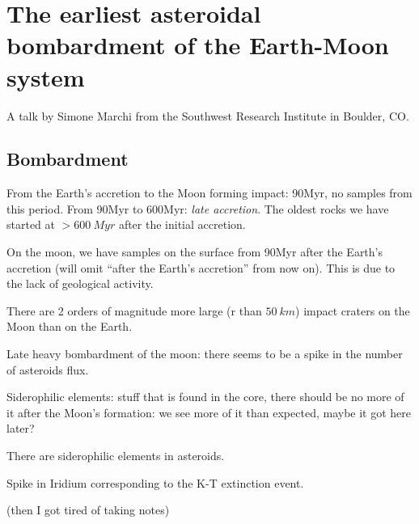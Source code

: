 \documentclass[main.tex]{subfiles}
\begin{document}
\section{The earliest asteroidal bombardment of the Earth-Moon system}

A talk by Simone Marchi from the Southwest Research Institute in Boulder, CO.

\subsection{Bombardment}

From the Earth's accretion to the Moon forming impact: 90Myr, no samples from this period.
From 90Myr to 600Myr: \emph{late accretion}. The oldest rocks we have started at \(>\SI{600}{Myr} \) after the initial accretion.

On the moon, we have samples on the surface from 90Myr after the Earth's accretion (will omit ``after the Earth's accretion'' from now on).
This is due to the lack of geological activity.

There are 2 orders of magnitude more large (r than \(\SI{50}{km}\)) impact craters on the Moon than on the Earth.

Late heavy bombardment of the moon: there seems to be a spike in the number of asteroids flux.

Siderophilic elements: stuff that is found in the core, there should be no more of it after the Moon's formation: we see more of it than expected, maybe it got here later?

There are siderophilic elements in asteroids.

Spike in Iridium corresponding to the K-T  extinction event.

(then I got tired of taking notes)
\end{document}
